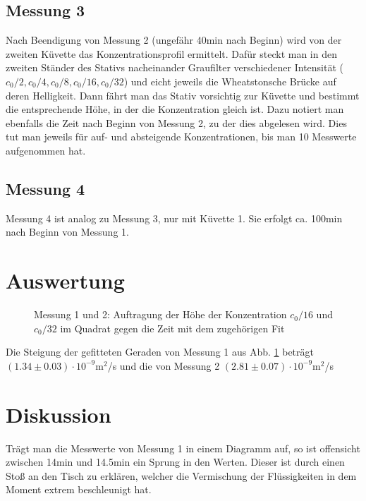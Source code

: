 \documentclass[12pt,a4paper,titlepage,headinclude,bibtotoc]{scrartcl}
\begin{document}
\subsection{Messung 3}
Nach Beendigung von Messung 2 (ungefähr 40min nach Beginn) wird von der zweiten Küvette das Konzentrationsprofil ermittelt.
Dafür steckt man in den zweiten Ständer des Stativs nacheinander Graufilter verschiedener Intensität ($c_0/2, c_0/4, c_0/8, c_0/16, c_0/32$) und eicht jeweils die Wheatstonsche Brücke auf deren Helligkeit.
Dann fährt man das Stativ vorsichtig zur Küvette und bestimmt die entsprechende Höhe, in der die Konzentration gleich ist.
Dazu notiert man ebenfalls die Zeit nach Beginn von Messung 2, zu der dies abgelesen wird.
Dies tut man jeweils für auf- und absteigende Konzentrationen, bis man 10 Messwerte aufgenommen hat.

\subsection{Messung 4}
Messung 4 ist analog zu Messung 3, nur mit Küvette 1.
Sie erfolgt ca. 100min nach Beginn von Messung 1.


\section{Auswertung}
\label{sec:auswertung}
\begin{figure}
\centering

\caption{Messung 1 und 2: Auftragung der Höhe der Konzentration $c_0/16$ und $c_0/32$ im Quadrat gegen die Zeit mit dem zugehörigen Fit\label{fig:M12}}
\end{figure}
Die Steigung der gefitteten Geraden von Messung 1 aus Abb. \ref{fig:M12} beträgt $(1.34\pm 0.03)\cdot 10^{-9}$m$^2$/s und die von Messung 2 $(2.81\pm 0.07)\cdot 10^{-9}$m$^2$/s




\section{Diskussion}
\label{sec:diskussion}
Trägt man die Messwerte von Messung 1 in einem Diagramm auf, so ist offensicht zwischen 14min und 14.5min ein Sprung in den Werten.
Dieser ist durch einen Stoß an den Tisch zu erklären, welcher die Vermischung der Flüssigkeiten in dem Moment extrem beschleunigt hat.
\end{document}
